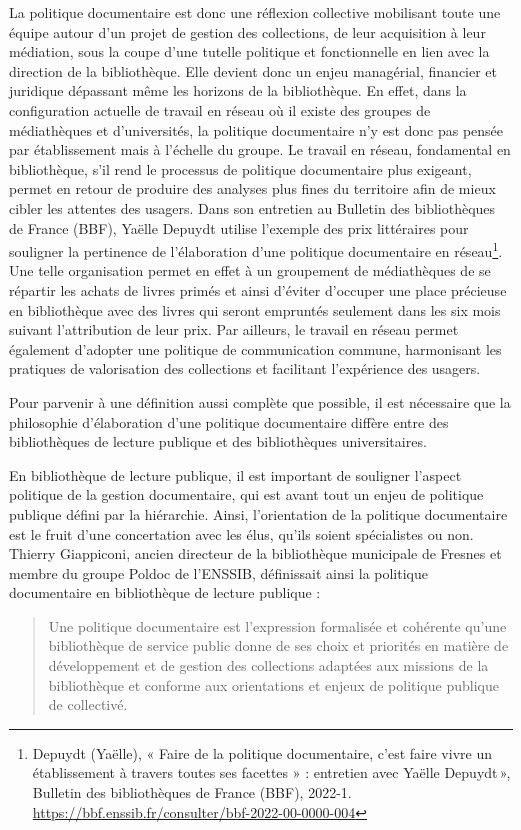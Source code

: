 La politique documentaire est donc une réflexion collective mobilisant toute une équipe autour d'un projet de gestion des collections, de leur acquisition à leur médiation, sous la coupe d'une tutelle politique et fonctionnelle en lien avec la direction de la bibliothèque. 
Elle devient donc un enjeu managérial, financier et juridique dépassant même les horizons de la bibliothèque. En effet, dans la configuration actuelle de travail en réseau où il existe des groupes de médiathèques et d'universités, la politique documentaire n'y est donc pas pensée par établissement mais à l'échelle du groupe. Le travail en réseau, fondamental en bibliothèque, s'il rend le processus de politique documentaire plus exigeant, permet en retour de produire des analyses plus fines du territoire afin de mieux cibler les attentes des usagers. 
Dans son entretien au Bulletin des bibliothèques de France (BBF), Yaëlle Depuydt utilise l'exemple des prix littéraires pour souligner la pertinence de l'élaboration d'une politique documentaire en réseau\footnote{Depuydt (Yaëlle), « Faire de la politique documentaire, c’est faire vivre un établissement à travers toutes ses facettes » : entretien avec Yaëlle Depuydt », Bulletin des bibliothèques de France (BBF), 2022-1. \url{https://bbf.enssib.fr/consulter/bbf-2022-00-0000-004}}. Une telle organisation permet en effet à un groupement de médiathèques de se répartir les achats de livres primés et ainsi d'éviter d'occuper une place précieuse en bibliothèque avec des livres qui seront empruntés seulement dans les six mois suivant l'attribution de leur prix. 
Par ailleurs, le travail en réseau permet également d'adopter une politique de communication commune, harmonisant les pratiques de valorisation des collections et facilitant l'expérience des usagers. 

Pour parvenir à une définition aussi complète que possible, il est nécessaire que la philosophie d'élaboration d'une politique documentaire diffère entre des bibliothèques de lecture publique et des bibliothèques universitaires. 

En bibliothèque de lecture publique, il est important de souligner l'aspect politique de la gestion documentaire, qui est avant tout un enjeu de politique publique défini par la hiérarchie. Ainsi, l'orientation de la politique documentaire est le fruit d'une concertation avec les élus, qu'ils soient spécialistes ou non. 
Thierry Giappiconi, ancien directeur de la bibliothèque municipale de Fresnes et membre du groupe Poldoc de l'ENSSIB, définissait ainsi la politique documentaire en bibliothèque de lecture publique : 
\begin{quotation}
	Une politique documentaire est l'expression formalisée et cohérente qu'une bibliothèque de service public donne de ses choix et priorités en matière de développement et de gestion des collections adaptées aux missions de la bibliothèque et conforme aux orientations et enjeux de politique publique de collectivé.
\end{quotation}

